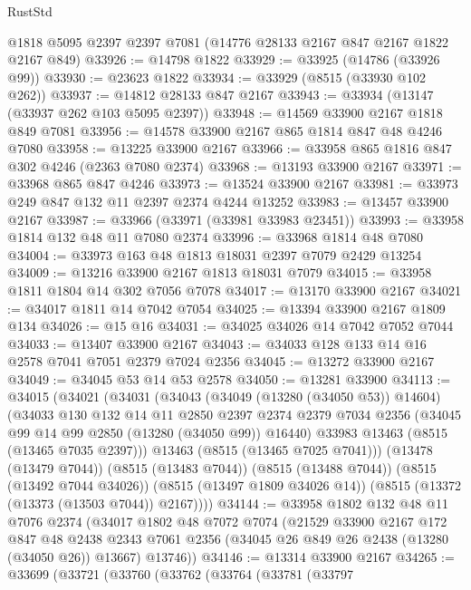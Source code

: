 \begin{lexlean}{RustStd}
\begin{coremodule}
    @1818
    @5095
    @2397
    @2397
    @7081
    (@14776 @28133 @2167 @847 @2167 @1822 @2167 @849)
@33926 := @14798 @1822
@33929 := @33925 (@14786 (@33926 @99))
@33930 := @23623 @1822
@33934 := @33929 (@8515 (@33930 @102 @262))
@33937 := @14812 @28133 @847 @2167
@33943 := @33934 (@13147 (@33937 @262 @103 @5095 @2397))
@33948 := @14569 @33900 @2167 @1818 @849 @7081
@33956 := @14578 @33900 @2167 @865 @1814 @847 @48 @4246 @7080
@33958 := @13225 @33900 @2167
@33966 := @33958 @865 @1816 @847 @302 @4246 (@2363 @7080 @2374)
@33968 := @13193 @33900 @2167
@33971 := @33968 @865 @847 @4246
@33973 := @13524 @33900 @2167
@33981 := @33973 @249 @847 @132 @11 @2397 @2374 @4244 @13252
@33983 := @13457 @33900 @2167
@33987 := @33966 (@33971 (@33981 @33983 @23451))
@33993 := @33958 @1814 @132 @48 @11 @7080 @2374
@33996 := @33968 @1814 @48 @7080
@34004 := @33973 @163 @48 @1813 @18031 @2397 @7079 @2429 @13254
@34009 := @13216 @33900 @2167 @1813 @18031 @7079
@34015 := @33958 @1811 @1804 @14 @302 @7056 @7078
@34017 := @13170 @33900 @2167
@34021 := @34017 @1811 @14 @7042 @7054
@34025 := @13394 @33900 @2167 @1809 @134
@34026 := @15 @16
@34031 := @34025 @34026 @14 @7042 @7052 @7044
@34033 := @13407 @33900 @2167
@34043 := @34033 @128 @133 @14 @16 @2578 @7041 @7051 @2379 @7024 @2356
@34045 := @13272 @33900 @2167
@34049 := @34045 @53 @14 @53 @2578
@34050 := @13281 @33900
@34113 := @34015
    (@34021
      (@34031
        (@34043
          (@34049 (@13280 (@34050 @53)) @14604)
          (@34033
            @130
            @132
            @14
            @11
            @2850
            @2397
            @2374
            @2379
            @7034
            @2356
            (@34045 @99 @14 @99 @2850 (@13280 (@34050 @99)) @16440)
            @33983
            @13463
            (@8515 (@13465 @7035 @2397)))
          @13463
          (@8515 (@13465 @7025 @7041)))
        (@13478 (@13479 @7044))
        (@8515 (@13483 @7044))
        (@8515 (@13488 @7044))
        (@8515 (@13492 @7044 @34026))
        (@8515 (@13497 @1809 @34026 @14))
        (@8515 (@13372 (@13373 (@13503 @7044)) @2167))))
@34144 := @33958
    @1802
    @132
    @48
    @11
    @7076
    @2374
    (@34017
      @1802
      @48
      @7072
      @7074
      (@21529
        @33900
        @2167
        @172
        @847
        @48
        @2438
        @2343
        @7061
        @2356
        (@34045 @26 @849 @26 @2438 (@13280 (@34050 @26)) @13667)
        @13746))
@34146 := @13314 @33900 @2167
@34265 := @33699
    (@33721
      (@33760
        (@33762
          (@33764
            (@33781
              (@33797

\end{coremodule}
\end{lexlean}
